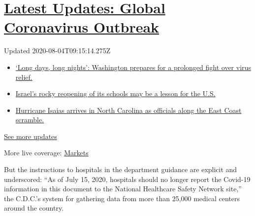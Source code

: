\hypertarget{latest-updates-global-coronavirus-outbreak}{%
\section{\texorpdfstring{\href{https://www.nytimes3xbfgragh.onion/2020/08/04/world/coronavirus-covid-19.html?action=click\&pgtype=Article\&state=default\&region=MAIN_CONTENT_1\&context=storylines_live_updates}{Latest
Updates: Global Coronavirus
Outbreak}}{Latest Updates: Global Coronavirus Outbreak}}\label{latest-updates-global-coronavirus-outbreak}}

Updated 2020-08-04T09:15:14.275Z

\begin{itemize}
\tightlist
\item
  \href{https://www.nytimes3xbfgragh.onion/2020/08/04/world/coronavirus-covid-19.html?action=click\&pgtype=Article\&state=default\&region=MAIN_CONTENT_1\&context=storylines_live_updates\#link-6b644638}{`Long
  days, long nights': Washington prepares for a prolonged fight over
  virus relief.}
\item
  \href{https://www.nytimes3xbfgragh.onion/2020/08/04/world/coronavirus-covid-19.html?action=click\&pgtype=Article\&state=default\&region=MAIN_CONTENT_1\&context=storylines_live_updates\#link-7af9fca0}{Israel's
  rocky reopening of its schools may be a lesson for the U.S.}
\item
  \href{https://www.nytimes3xbfgragh.onion/2020/08/04/world/coronavirus-covid-19.html?action=click\&pgtype=Article\&state=default\&region=MAIN_CONTENT_1\&context=storylines_live_updates\#link-33bf9168}{Hurricane
  Isaias arrives in North Carolina as officials along the East Coast
  scramble.}
\end{itemize}

\href{https://www.nytimes3xbfgragh.onion/2020/08/04/world/coronavirus-covid-19.html?action=click\&pgtype=Article\&state=default\&region=MAIN_CONTENT_1\&context=storylines_live_updates}{See
more updates}

More live coverage:
\href{https://www.nytimes3xbfgragh.onion/live/2020/08/03/business/stock-market-today-coronavirus?action=click\&pgtype=Article\&state=default\&region=MAIN_CONTENT_1\&context=storylines_live_updates}{Markets}

But the instructions to hospitals in the department guidance are
explicit and underscored: ``As of July 15, 2020, hospitals should no
longer report the Covid-19 information in this document to the National
Healthcare Safety Network site,'' the C.D.C.'s system for gathering data
from more than 25,000 medical centers around the country.

